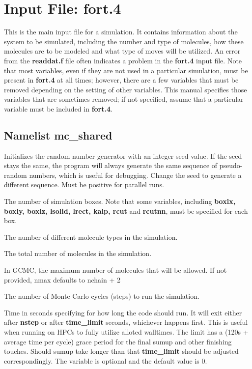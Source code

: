 \documentclass[12pt,letterpaper]{article}
\begin{document}
\section{Input File: \textbf{fort.4}}
This is the main input file for a simulation. It contains
information about the system to be simulated, including the
number and type of molecules, how these molecules are to be
modeled and what type of moves will be utilized. An error
from the {\bf readdat.f} file often indicates a problem in
the {\bf fort.4} input file. Note that most variables, even
if they are not used in a particular simulation, must be
present in {\bf fort.4} at all times; however, there are a
few variables that must be removed depending on the setting
of other variables. This manual specifies those variables
that are sometimes removed; if not specified, assume that a
particular variable must be included in {\bf fort.4}.

\subsection{Namelist \textbf{mc\_shared}}
 Initializes the random number generator
with an integer seed value. If the seed stays the same, the
program will always generate the same sequence of
pseudo-random numbers, which is useful for debugging. Change
the seed to generate a different sequence. Must be positive
for parallel runs.

 The number of simulation boxes. Note
that some variables, including {\bf boxlx, boxly, boxlz,
  lsolid, lrect, kalp, rcut} and {\bf rcutnn}, must be
specified for each box.

 The number of different molecule
types in the simulation.

 The total number of molecules in the simulation.

 In GCMC, the maximum number of molecules that
will be allowed. If not provided, nmax defaults to nchain + 2

 The number of Monte Carlo cycles
(steps) to run the simulation.

 Time in seconds specifying for
how long the code should run. It will exit either after {\bf nstep}
or after {\bf time\_limit} seconds, whichever happens first. This
is useful when running on HPCs to fully utilize alloted walltimes. 
The limit has a (120s + average time per cycle) grace period 
for the final sumup and other finishing touches. 
Should sumup take longer than that {\bf time\_limit} 
should be adjusted correspondingly. The variable is
optional and the default value is 0.
\end{document}
